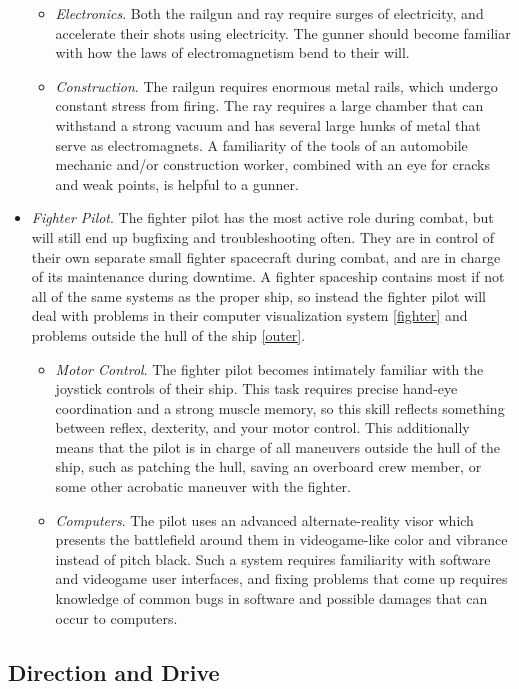 \documentclass[a4paper]{article}
\begin{document}
\begin{itemize}
\begin{itemize}
\item \textit{Electronics}. Both the railgun and ray require surges of electricity, and accelerate their shots using electricity. The gunner should become familiar with how the laws of electromagnetism bend to their will.
\item \textit{Construction}. The railgun requires enormous metal rails, which undergo constant stress from firing. The ray requires a large chamber that can withstand a strong vacuum and has several large hunks of metal that serve as electromagnets. A familiarity of the tools of an automobile mechanic and/or construction worker, combined with an eye for cracks and weak points, is helpful to a gunner.
\end{itemize}
\item \textit{Fighter Pilot}. The fighter pilot has the most active role during combat, but will still end up bugfixing and troubleshooting often. They are in control of their own separate small fighter spacecraft during combat, and are in charge of its maintenance during downtime. A fighter spaceship contains most if not all of the same systems as the proper ship, so instead the fighter pilot will deal with problems in their computer visualization system \ref{fighter} and problems outside the hull of the ship \ref{outer}. 
\begin{itemize}
\item \textit{Motor Control}. The fighter pilot becomes intimately familiar with the joystick controls of their ship. This task requires precise hand-eye coordination and a strong muscle memory, so this skill reflects something between reflex, dexterity, and your motor control. This additionally means that the pilot is in charge of all maneuvers outside the hull of the ship, such as patching the hull, saving an overboard crew member, or some other acrobatic maneuver with the fighter.
\item \textit{Computers}. The pilot uses an advanced alternate-reality visor which presents the battlefield around them in videogame-like color and vibrance instead of pitch black. Such a system requires familiarity with software and videogame user interfaces, and fixing problems that come up requires knowledge of common bugs in software and possible damages that can occur to computers.
\end{itemize}
\end{itemize}

\subsection{Direction and Drive}
\end{document}
